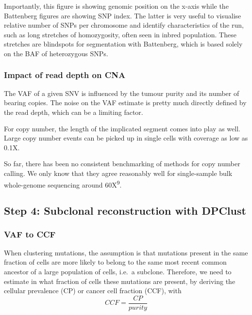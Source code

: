 \documentclass[]{article}
\begin{document}
Importantly, this figure is showing genomic position on the x-axis while
the Battenberg figures are showing SNP index. The latter is very useful
to visualise relative number of SNPs per chromosome and identify
characteristics of the run, such as long stretches of homozygosity,
often seen in inbred population. These stretches are blindspots for
segmentation with Battenberg, which is based solely on the BAF of
heterozygous SNPs.

\hypertarget{impact-of-read-depth-on-cna}{%
\subsubsection{Impact of read depth on
CNA}\label{impact-of-read-depth-on-cna}}

The VAF of a given SNV is influenced by the tumour purity and its number
of bearing copies. The noise on the VAF estimate is pretty much directly
defined by the read depth, which can be a limiting factor.

For copy number, the length of the implicated segment comes into play as
well. Large copy number events can be picked up in single cells with
coverage as low as 0.1X.

So far, there has been no consistent benchmarking of methods for copy
number calling. We only know that they agree reasonably well for
single-sample bulk whole-genome sequencing around
60X\textsuperscript{9}.

\newpage

\hypertarget{step-4-subclonal-reconstruction-with-dpclust}{%
\subsection{Step 4: Subclonal reconstruction with
DPClust}\label{step-4-subclonal-reconstruction-with-dpclust}}

\hypertarget{vaf-to-ccf}{%
\subsubsection{VAF to CCF}\label{vaf-to-ccf}}

When clustering mutations, the assumption is that mutations present in
the same fraction of cells are more likely to belong to the same most
recent common ancestor of a large population of cells, i.e.~a subclone.
Therefore, we need to estimate in what fraction of cells these mutations
are present, by deriving the cellular prevalence (CP) or cancer cell
fraction (CCF), with \[CCF=\frac{CP}{purity}\]
\end{document}
